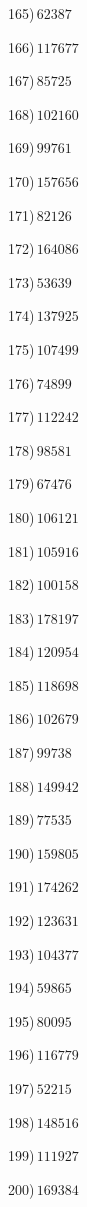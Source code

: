 \documentclass{article}
\begin{document}
\begin{multicols}{2}
165)$\,62387$ \par 
166)$\,117677$ \par 
167)$\,85725$ \par 
168)$\,102160$ \par 
169)$\,99761$ \par 
170)$\,157656$ \par 
171)$\,82126$ \par 
172)$\,164086$ \par 
173)$\,53639$ \par 
174)$\,137925$ \par 
175)$\,107499$ \par 
176)$\,74899$ \par 
177)$\,112242$ \par 
178)$\,98581$ \par 
179)$\,67476$ \par 
180)$\,106121$ \par 
181)$\,105916$ \par 
182)$\,100158$ \par 
183)$\,178197$ \par 
184)$\,120954$ \par 
185)$\,118698$ \par 
186)$\,102679$ \par 
187)$\,99738$ \par 
188)$\,149942$ \par 
189)$\,77535$ \par 
190)$\,159805$ \par 
191)$\,174262$ \par 
192)$\,123631$ \par 
193)$\,104377$ \par 
194)$\,59865$ \par 
195)$\,80095$ \par 
196)$\,116779$ \par 
197)$\,52215$ \par 
198)$\,148516$ \par 
199)$\,111927$ \par 
200)$\,169384$ \par 
\end{multicols} 
\end{document}
